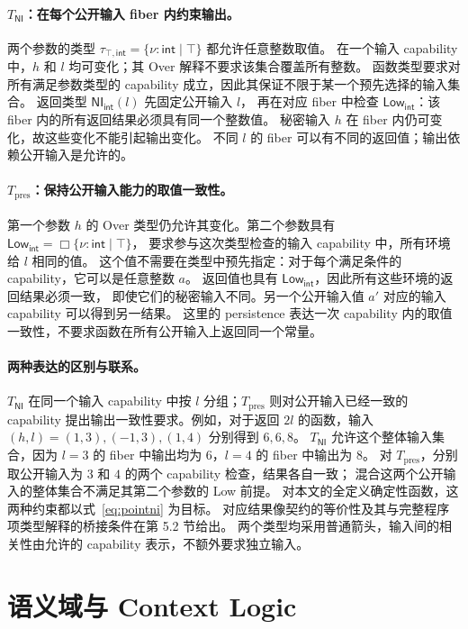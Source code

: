 \documentclass[UTF8,a4paper,11pt,fontset=fandol]{ctexart}
\newcommand{\oty}[2]{\{\nu:#1\mid #2\}}
\newcommand{\NI}{\mathsf{NI}}
\begin{document}
\paragraph{$T_{\NI}$：在每个公开输入 fiber 内约束输出。}
两个参数的类型 $\tau_{\top,\mathsf{int}}=\oty{\mathsf{int}}{\top}$ 都允许任意整数取值。
在一个输入 capability 中，$h$ 和 $l$ 均可变化；其 Over 解释不要求该集合覆盖所有整数。
函数类型要求对所有满足参数类型的 capability 成立，因此其保证不限于某一个预先选择的输入集合。
返回类型 $\mathsf{NI}_{\mathsf{int}}(l)$ 先固定公开输入 $l$，
再在对应 fiber 中检查 $\mathsf{Low}_{\mathsf{int}}$：该 fiber 内的所有返回结果必须具有同一个整数值。
秘密输入 $h$ 在 fiber 内仍可变化，故这些变化不能引起输出变化。
不同 $l$ 的 fiber 可以有不同的返回值；输出依赖公开输入是允许的。

\paragraph{$T_{\mathrm{pres}}$：保持公开输入能力的取值一致性。}
第一个参数 $h$ 的 Over 类型仍允许其变化。第二个参数具有
$\mathsf{Low}_{\mathsf{int}}=\Box\oty{\mathsf{int}}{\top}$，
要求参与这次类型检查的输入 capability 中，所有环境给 $l$ 相同的值。
这个值不需要在类型中预先指定：对于每个满足条件的 capability，它可以是任意整数 $a$。
返回值也具有 $\mathsf{Low}_{\mathsf{int}}$，因此所有这些环境的返回结果必须一致，
即使它们的秘密输入不同。另一个公开输入值 $a'$ 对应的输入 capability 可以得到另一结果。
这里的 persistence 表达一次 capability 内的取值一致性，不要求函数在所有公开输入上返回同一个常量。

\paragraph{两种表达的区别与联系。}
$T_{\NI}$ 在同一个输入 capability 中按 $l$ 分组；$T_{\mathrm{pres}}$ 则对公开输入已经一致的
capability 提出输出一致性要求。例如，对于返回 $2l$ 的函数，输入
$(h,l)=(1,3),(-1,3),(1,4)$ 分别得到 $6,6,8$。
$T_{\NI}$ 允许这个整体输入集合，因为 $l=3$ 的 fiber 中输出均为 $6$，$l=4$ 的 fiber 中输出为 $8$。
对 $T_{\mathrm{pres}}$，分别取公开输入为 $3$ 和 $4$ 的两个 capability 检查，结果各自一致；
混合这两个公开输入的整体集合不满足其第二个参数的 Low 前提。
对本文的全定义确定性函数，这两种约束都以式~\eqref{eq:pointni} 为目标。
对应结果像契约的等价性及其与完整程序项类型解释的桥接条件在第 5.2 节给出。
两个类型均采用普通箭头，输入间的相关性由允许的 capability 表示，不额外要求独立输入。

\section{语义域与 Context Logic}
\end{document}

